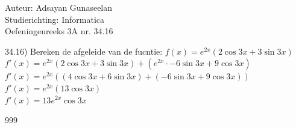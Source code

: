 \documentclass[a4paper]{article}
\begin{document}
\noindent \large Auteur: Adsayan Gunaseelan \\
\noindent \large Studierichting: Informatica\\
\noindent \large Oefeningenreeks 3A nr. 34.16\\

\medskip

\normalsize
34.16) Bereken de afgeleide van de fucntie: $f(x) = e^{2x}(2\cos3x + 3\sin3x)$ \\

$f'(x) = e^{2x}(2\cos3x + 3\sin3x) + (e^{2x}\cdot -6\sin3x + 9\cos3x)$ \\

$f'(x) = e^{2x}((4\cos3x + 6\sin3x)+(-6\sin3x+9\cos3x))$ \\

$f'(x) = e^{2x}(13\cos3x)$\\

$f'(x) = 13e^{2x}\cos3x$\\


\begin{thebibliography}{999}
\end{thebibliography}
\end{document}
